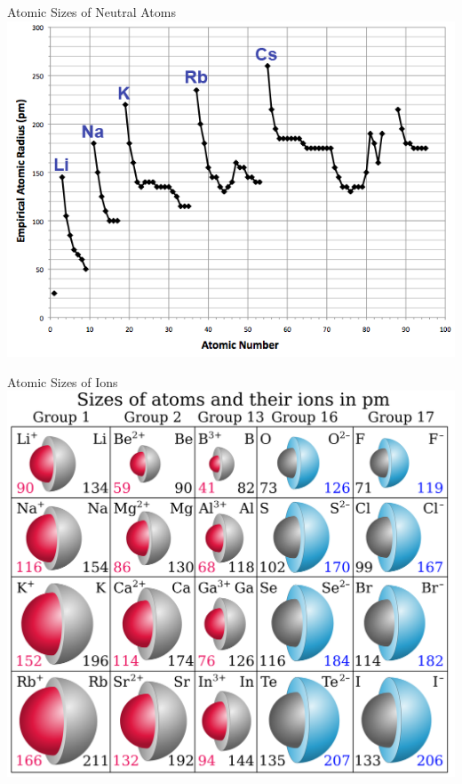 \documentclass[11pt]{beamer}
\begin{document}
\begin{frame}{Atomic Sizes of Neutral Atoms}
  \centering
  \includegraphics[width=\linewidth]{graph_atomic_rad}
\end{frame}

\begin{frame}{Atomic Sizes of Ions}
  \centering
  \includegraphics[width=0.8\linewidth]{ion_radii}
\end{frame}
\end{document}
